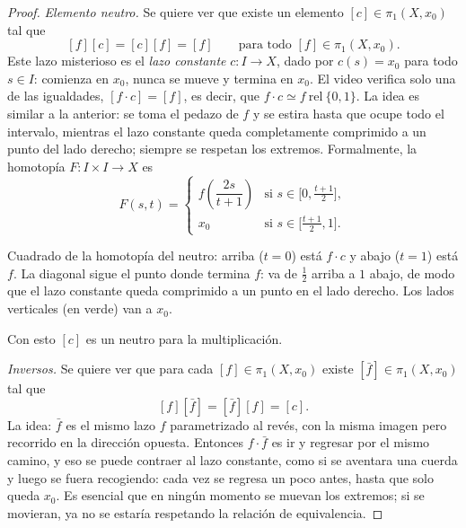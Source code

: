 \documentclass[11pt]{article}
\begin{document}
\begin{proof}
\medskip\noindent\textit{Elemento neutro.}
Se quiere ver que existe un elemento $[c]\in\pi_1(X,x_0)$ tal que
\[
  [f][c]=[c][f]=[f]\qquad\text{para todo } [f]\in\pi_1(X,x_0).
\]
Este lazo misterioso es el \emph{lazo constante} $c\colon I\to X$, dado por $c(s)=x_0$ para todo $s\in I$: comienza en $x_0$, nunca se mueve y termina en $x_0$. El video verifica solo una de las igualdades, $[f\cdot c]=[f]$, es decir, que $f\cdot c\simeq f\ \mathrm{rel}\ \{0,1\}$. La idea es similar a la anterior: se toma el pedazo de $f$ y se estira hasta que ocupe todo el intervalo, mientras el lazo constante queda completamente comprimido a un punto del lado derecho; siempre se respetan los extremos. Formalmente, la homotopía $F\colon I\times I\to X$ es
\[
  F(s,t)=
  \begin{cases}
    f\!\left(\dfrac{2s}{t+1}\right) & \text{si } s\in\bigl[0,\tfrac{t+1}{2}\bigr],\\[8pt]
    x_0 & \text{si } s\in\bigl[\tfrac{t+1}{2},1\bigr].
  \end{cases}
\]
\begin{center}
\par\smallskip
\begin{minipage}{0.9\textwidth}\small\centering
Cuadrado de la homotopía del neutro: arriba ($t=0$) está $f\cdot c$ y abajo ($t=1$) está $f$. La diagonal sigue el punto donde termina $f$: va de $\tfrac12$ arriba a $1$ abajo, de modo que el lazo constante queda comprimido a un punto en el lado derecho. Los lados verticales (en verde) van a $x_0$.
\end{minipage}
\end{center}

Con esto $[c]$ es un neutro para la multiplicación.

\medskip\noindent\textit{Inversos.}
Se quiere ver que para cada $[f]\in\pi_1(X,x_0)$ existe $[\bar f]\in\pi_1(X,x_0)$ tal que
\[
  [f][\bar f]=[\bar f][f]=[c].
\]
La idea: $\bar f$ es el mismo lazo $f$ parametrizado al revés, con la misma imagen pero recorrido en la dirección opuesta. Entonces $f\cdot\bar f$ es ir y regresar por el mismo camino, y eso se puede contraer al lazo constante, como si se aventara una cuerda y luego se fuera recogiendo: cada vez se regresa un poco antes, hasta que solo queda $x_0$. Es esencial que en ningún momento se muevan los extremos; si se movieran, ya no se estaría respetando la relación de equivalencia.


\end{proof}
\end{document}
